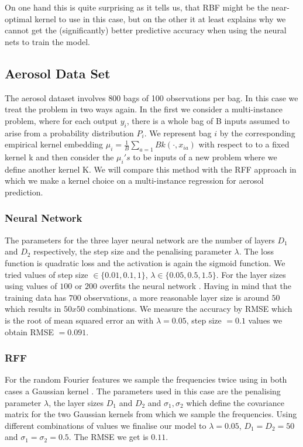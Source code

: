 \documentclass{article} %
\begin{document}
On one hand this is quite surprising as it tells us, that RBF might be the near-optimal kernel to use in this case, but on the other it at least explains why we cannot get the (significantly) better predictive accuracy when using the neural nets to train the model.


\subsection{Aerosol Data Set}
The aerosol dataset involves 800 bags of 100 observations per bag.  In this case we treat the problem in two ways again. In the first we consider a multi-instance problem, where for each output $y_{i}$, there is a whole bag of B inputs assumed to arise from a probability distribution $P_{i}$. We represent  bag $i$ by the corresponding 
empirical kernel embedding $\mu_{i} = \frac{1}{B} \sum_{a=1}{B} k( \cdot, x_{ia})$ with respect to to a fixed kernel k and then consider the $\mu_{i} 's$ to be inputs of a new problem where we define another kernel K. 
We will compare this method with the RFF approach in which we make a kernel choice on a multi-instance regression for
aerosol prediction. 
\subsubsection{Neural Network}
The parameters for the three layer neural network are the number of layers $D_1$ and $D_2$ respectively, the step size and the penalising parameter $\lambda$. The loss function is quadratic loss and the activation is again the sigmoid function. We tried values of step size $\in \{  0.01, 0.1, 1\}$, $\lambda \in \{ 0.05, 0.5, 1.5 \}$. For the layer sizes using values of $100$ or $200$ overfits the neural network . Having in mind that the training data has $700$ observations, a more reasonable layer size is around $50$ which results in $50 x 50$ combinations. We measure the accuracy by RMSE which is the root of mean squared error an with $\lambda = 0.05$, step size $ = 0.1$ values we obtain RMSE $=0.091$.
\subsubsection{ RFF}
For the random Fourier features we sample the frequencies twice using in both cases a Gaussian kernel . The parameters used in this case are the penalising parameter $\lambda$, the layer sizes $D_1$ and $D_2$ and $\sigma_1, \sigma_2$ which define the covariance matrix for the two Gaussian kernels from which we sample the frequencies. Using different combinations of values we finalise our model to $\lambda= 0.05$, $D_1=D_2=50$ and $\sigma_1=\sigma_2 = 0.5$. The RMSE we get is $0.11$.
\end{document}
